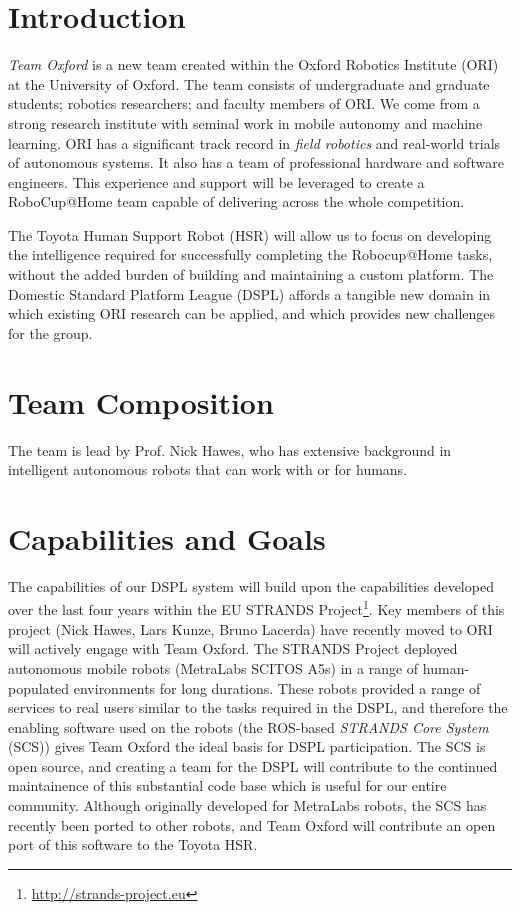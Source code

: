 \documentclass[runningheads,a4paper]{llncs}
\newcommand{\teamori}{Team Oxford}
\begin{document}
\section{Introduction}
\textit{\teamori{}} is a new team created within the Oxford Robotics Institute
(ORI) at the University of Oxford. The team consists of undergraduate and
graduate students; robotics researchers; and faculty members of ORI. We come
from a strong research institute with seminal work in mobile autonomy and
machine learning. ORI has a significant track record in \emph{field robotics}
and real-world trials of autonomous systems. It also has a team of professional
hardware and software engineers. This experience and support will be leveraged
to create a RoboCup@Home team capable of delivering across the whole
competition. 

The Toyota Human Support Robot (HSR) will allow us to focus on developing the
intelligence required for successfully completing the Robocup@Home tasks, 
without the added burden of building and maintaining a custom platform.
The Domestic Standard Platform League (DSPL) affords a tangible new domain in
which existing ORI research can be applied, and which provides new challenges
for the group. 

\section{Team Composition}

The team is lead by Prof. Nick Hawes, who has extensive background in
intelligent autonomous robots that can work with or for humans.

\section{Capabilities and Goals}

The capabilities of our DSPL system will build upon the capabilities developed over the last four years within the EU STRANDS Project\footnote{\url{http://strands-project.eu}}. Key members of this project (Nick Hawes, Lars Kunze, Bruno Lacerda) have recently moved to ORI will actively engage with \teamori. The STRANDS Project deployed autonomous mobile robots (MetraLabs SCITOS A5s) in a range of human-populated environments for long durations\cite{strands@ram}. These robots provided a range of services to real users similar to the tasks required in the DSPL, and therefore the enabling software used on the robots (the ROS-based \emph{STRANDS Core System} (SCS)) gives \teamori{} the ideal basis for DSPL participation. The SCS is open source, and creating a team for the DSPL will contribute to the continued maintainence of this substantial code base which is useful for our entire community. Although originally developed for MetraLabs robots, the SCS has recently been ported to other robots, and \teamori{} will contribute an open port of this software to the Toyota HSR. 
\end{document}
